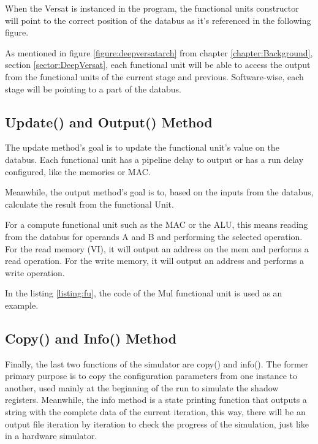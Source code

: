 When the Versat is instanced in the program, the functional units constructor will point
to the correct position of the databus as it's referenced in the following figure.

As mentioned in figure \ref{figure:deepversatarch} from chapter \ref{chapter:Background}, section \ref{sector:DeepVersat}, 
each functional unit will be able to access the output from the functional units of the
current stage and previous. Software-wise, each stage will be pointing to a part of the databus.  



\subsection{Update() and Output() Method}


The update method's goal is to update the functional unit's value on the databus. 
Each functional unit has a pipeline delay to output or has a run delay configured, 
like the memories or MAC.

Meanwhile, the output method's goal is to, based on the inputs from the databus, calculate the result from
 the functional Unit.

 For a compute functional unit such as the MAC or the ALU, this means reading from the databus for operands A and B
 and performing the selected operation. For the read memory (VI), it will output an address on the mem
 and performs a read operation. For the write memory, it will output an address and performs a write operation.

 In the listing \ref{listing:fu}, the code of the Mul functional unit is used as an example.

 \newpage
 


\subsection{Copy() and Info() Method}

Finally, the last two functions of the simulator are copy() and info(). The former primary purpose is to copy the configuration parameters from one instance to another,
used mainly at the beginning of the run to simulate the shadow registers.
Meanwhile, the info method is a state printing function that outputs a string with the complete data of the current iteration,
this way, there will be an output file iteration by iteration to check the progress of the simulation, just like in a hardware simulator.


